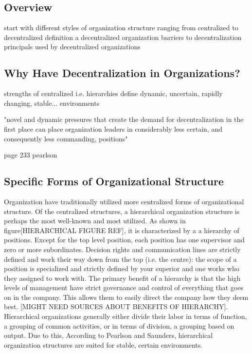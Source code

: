 \subsection{Overview}
start with different styles of organization structure ranging from centralized to decentralized
definition a decentralized organization
barriers to decentralization
principals used by decentralized organizations


\subsection{Why Have Decentralization in Organizations?}
strengths of centralized i.e. hierarchies
define dynamic, uncertain, rapidly changing, stable... environments

"novel and dynamic pressures that create the demand for decentralization in the first place can place organization leaders in considerably less certain, and consequently less commanding, positions"

page 233 pearlson

\subsection{Specific Forms of Organizational Structure}
\label{org:form}

Organization have traditionally utilized more centralized forms of organizational structure. Of the centralized structures, a hierarchical organization structure is perhaps the most well-known and most utilized. As shown in figure[HIERARCHICAL FIGURE REF], it is characterized by a a hierarchy of positions. Except for the top level position, each position has one supervisor and zero or more subordinates. Decision rights and communication lines are strictly defined and work their way down from the top (i.e. the centre): the scope of a position is specialized and strictly defined by your superior and one works who they assigned to work with. The primary benefit of a hierarchy is that the high levels of management have strict governance and control of everything that goes on in the company. This allows them to easily direct the company how they deem best. [MIGHT NEED SOURCES ABOUT BENEFITS OF HIERARCHY]. Hierarchical organizations generally either divide their labor in terms of function, a grouping of common activities, or in terms of division, a grouping based on output. Due to this, According to Pearlson and Saunders, hierarchical organization structures are suited for stable, certain environments. ~\cite{pearlson2009}

